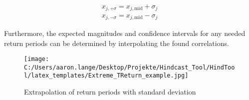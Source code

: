 $$
\begin{aligned}
x_{j,+\sigma}=x_{j, \text{mid}}+\sigma_{j} \\
x_{j,-\sigma}=x_{j, \text{mid}}-\sigma_{j}
\end{aligned}
$$

Furthermore, the expected magnitudes and confidence intervals for any needed return periods can be determined by interpolating the found correlations.\\


\begin{figure}[H] 
 \centering 
 \texttt{[image: C:/Users/aaron.lange/Desktop/Projekte/Hindcast\_Tool/HindTool/latex\_templates/Extreme\_TReturn\_example.jpg]} 
 \caption{ Extrapolation of return periods with standard deviation } 
 \label{fig: Extreme_TReturn_example } 
\end{figure}

\clearpage


